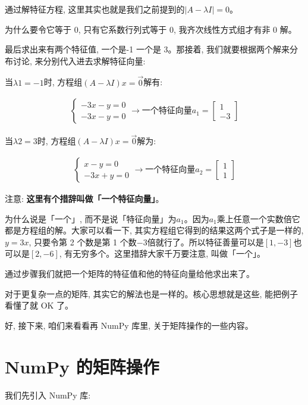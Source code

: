 通过解特征方程, 这里其实也就是我们之前提到的$|A - \lambda I| =0$。

为什么要令它等于 0, 只有它系数行列式等于 0, 我齐次线性方式组才有非 0 解。

最后求出来有两个特征值, 一个是-1 一个是 3。那接着, 我们就要根据两个解来分布讨论, 来分别代入进去求解特征向量: 

当$\lambda 1 = -1$时, 方程组$(A - \lambda I)x = \vec 0$解有: 

\begin{align*}
\begin{cases}
-3x - y = 0 \\
-3x - y = 0
\end{cases}
\to\mbox{一个特征向量}a_1 = \begin{bmatrix} 1 \\ -3 \end{bmatrix}
\end{align*}

当$\lambda 2 = 3$时, 方程组$(A - \lambda I)x = \vec 0$解为: 

\begin{align*}
\begin{cases}
x - y = 0 \\
-3x + y = 0
\end{cases}
\to \mbox{一个特征向量} a_2 = \begin{bmatrix} 1 \\ 1 \end{bmatrix}
\end{align*}

注意: \textbf{这里有个措辞叫做「一个特征向量」}。

为什么说是「一个」, 而不是说「特征向量」为$a_1$。因为$a_1$乘上任意一个实数倍它都是方程组的解。大家可以看一下, 其实方程组它得到的结果这两个式子是一样的, $y=3x$, 只要令第 2 个数是第 1 个数$-3$倍就行了。所以特征善量可以是$[1, -3]$也可以是$[2, -6]$, 有无穷多个。这里措辞大家千万要注意, 叫做「一个」。

通过步骤我们就把一个矩阵的特征值和他的特征向量给他求出来了。

对于更复杂一点的矩阵, 其实它的解法也是一样的。核心思想就是这些, 能把例子看懂了就 OK 了。

好, 接下来, 咱们来看看再 NumPy 库里, 关于矩阵操作的一些内容。

\section{NumPy 的矩阵操作}

我们先引入 NumPy 库: 

